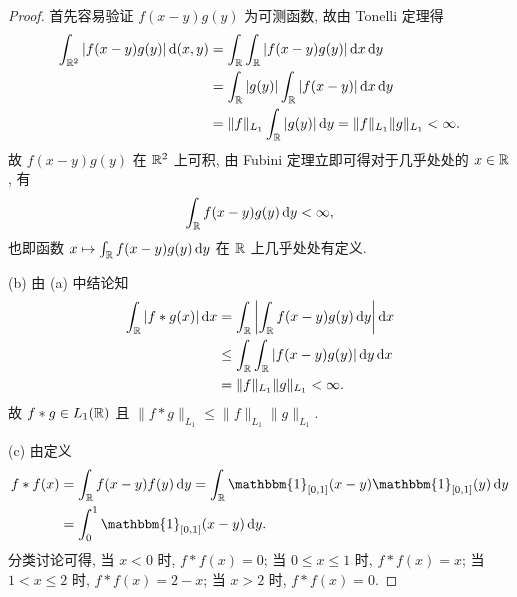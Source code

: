 \begin{proof}
    首先容易验证 $f(x-y)g(y)$ 为可测函数, 故由 Tonelli 定理得
    \begin{align*}
        \int_{\mathbb{R}^2} |f(x-y)g(y)|\mathop{}\!\mathrm{d}(x,y)
        & =\int_{\mathbb{R}}\int_{\mathbb{R}} |f(x-y)g(y)|\mathop{}\!\mathrm{d} x\mathop{}\!\mathrm{d} y \\
        & =\int_{\mathbb{R}}|g(y)|\int_{\mathbb{R}} |f(x-y)|\mathop{}\!\mathrm{d} x\mathop{}\!\mathrm{d} y \\
        & =\|f\|_{L_1}\int_{\mathbb{R}}|g(y)|\mathop{}\!\mathrm{d} y=\|f\|_{L_1}\|g\|_{L_1}<\infty.
    \end{align*}
    故 $f(x-y)g(y)$ 在 $\mathbb{R}^2$ 上可积, 由 Fubini 定理立即可得对于几乎处处的 $x\in\mathbb{R}$, 有
    \[\int_{\mathbb{R}}f(x-y)g(y)\mathop{}\!\mathrm{d} y<\infty,\]
    也即函数 $x\mapsto\int_{\mathbb{R}}f(x-y)g(y)\mathop{}\!\mathrm{d} y$ 在 $\mathbb{R}$ 上几乎处处有定义.

    (b) 由 (a) 中结论知
    \begin{align*}
        \int_{\mathbb{R}}|f*g(x)|\mathop{}\!\mathrm{d} x
        & =\int_{\mathbb{R}}\left|\int_{\mathbb{R}}f(x-y)g(y)\mathop{}\!\mathrm{d} y\right|\mathop{}\!\mathrm{d} x \\
        & \leq\int_{\mathbb{R}}\int_{\mathbb{R}}|f(x-y)g(y)|\mathop{}\!\mathrm{d} y\mathop{}\!\mathrm{d} x \\
        & =\|f\|_{L_1}\|g\|_{L_1}<\infty.
    \end{align*}
    故 $f*g\in L_1(\mathbb{R})$ 且 $\|f*g\|_{L_1}\leq\|f\|_{L_1}\|g\|_{L_1}$.

    (c) 由定义
    \begin{align*}
        f*f(x)
        & =\int_{\FR} f(x-y)f(y)\diff y=\int_{\FR} \mathbbm{1}_{[0,1]}(x-y)\mathbbm{1}_{[0,1]}(y)\diff y \\
        & =\int_0^1 \mathbbm{1}_{[0,1]}(x-y)\diff y.
    \end{align*}
    分类讨论可得, 当 $x<0$ 时, $f*f(x)=0$;
    当 $0\leq x\leq 1$ 时, $f*f(x)=x$;
    当 $1<x\leq 2$ 时, $f*f(x)=2-x$;
    当 $x>2$ 时, $f*f(x)=0$.
\end{proof}



